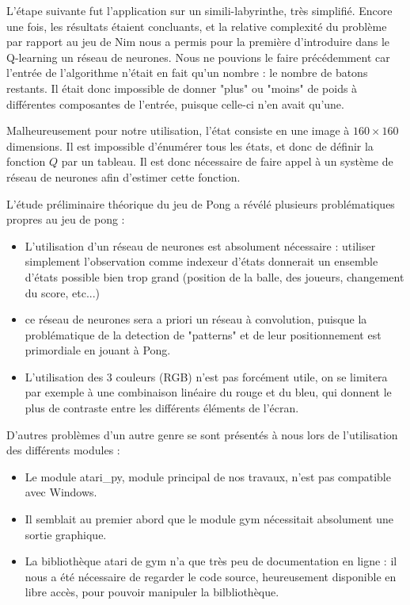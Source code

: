 \documentclass[
    10pt,
    a4paper,
    oneside,
    headinclude,footinclude,
    BCOR=5mm,
    captions=tableabove
]{scrartcl}
\begin{document}
L'étape suivante fut l'application sur un simili-labyrinthe, très simplifié. Encore une fois, les résultats étaient concluants, et la relative complexité du problème par rapport au jeu de Nim nous a permis pour la première d'introduire dans le Q-learning un réseau de neurones. Nous ne pouvions le faire précédemment car l'entrée de l'algorithme n'était en fait qu'un nombre : le nombre de batons restants. Il était donc impossible de donner "plus" ou "moins" de poids à différentes composantes de l'entrée, puisque celle-ci n'en avait qu'une.

Malheureusement pour notre utilisation, l'état consiste en une image à $160 \times 160$ dimensions. Il est impossible d'énumérer tous les états, et donc de définir la fonction $Q$ par un tableau. Il est donc nécessaire de faire appel à un système de réseau de neurones afin d'estimer cette fonction.

L'étude préliminaire théorique du jeu de Pong a révélé plusieurs problématiques propres au jeu de pong :
\begin{itemize}
	\item L'utilisation d'un réseau de neurones est absolument nécessaire : utiliser simplement l'observation comme indexeur d'états donnerait un ensemble d'états possible bien trop grand (position de la balle, des joueurs, changement du score, etc...)
	\item ce réseau de neurones sera a priori un réseau à convolution, puisque la problématique de la detection de "patterns" et de leur positionnement est primordiale en jouant à Pong.
	\item L'utilisation des 3 couleurs (RGB) n'est pas forcément utile, on se limitera par exemple à une combinaison linéaire du rouge et du bleu, qui donnent le plus de contraste entre les différents éléments de l'écran.
\end{itemize}

D'autres problèmes d'un autre genre se sont présentés à nous lors de l'utilisation des différents modules :
\begin{itemize}
	\item Le module atari\_py, module principal de nos travaux, n'est pas compatible avec Windows.
	\item Il semblait au premier abord que le module gym nécessitait absolument une sortie graphique.
	\item La bibliothèque atari de gym n'a que très peu de documentation en ligne : il nous a été nécessaire de regarder le code source, heureusement disponible en libre accès, pour pouvoir manipuler la bilbliothèque.
\end{itemize}
\end{document}
